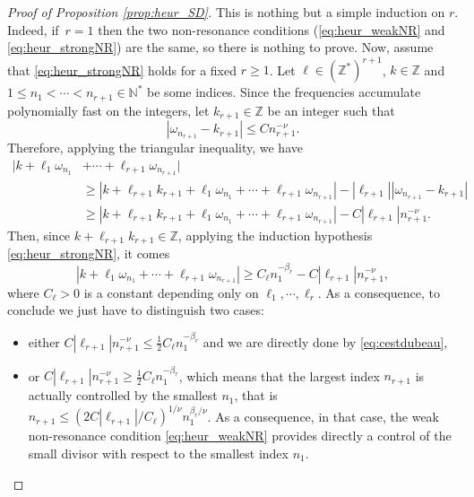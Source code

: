 \begin{proof}[Proof of Proposition \ref{prop:heur_SD}] This is nothing but a simple induction on $r$. Indeed, if~$r=1$ then the two non-resonance conditions (\eqref{eq:heur_weakNR} and \eqref{eq:heur_strongNR}) are the same, so there is nothing to prove. Now, assume that \eqref{eq:heur_strongNR} holds for a fixed $r\geq 1$. Let $\ell \in (\mathbb{Z}^*)^{r+1}$, $k \in \mathbb{Z}$ and $1\leq n_1< \cdots < n_{r+1} \in \mathbb{N}^*$ be some indices. Since the frequencies accumulate polynomially fast on the integers, let $k_{r+1} \in \mathbb{Z}$ be an integer such that
\[
|\omega_{n_{r+1}} - k_{r+1} | \leq C n_{r+1}^{-\nu}.
\]
Therefore, applying the triangular inequality, we have
\begin{equation*}
\begin{split}
|k+\ell_1 \omega_{n_1}& + \cdots + \ell_{r+1} \omega_{n_{r+1}}| \\ &\geq |k+\ell_{r+1} k_{r+1}+\ell_1 \omega_{n_1} + \cdots + \ell_{r+1} \omega_{n_{r+1}}|- |\ell_{r+1}| |\omega_{n_{r+1}} - k_{r+1} | \\
&\geq |k+\ell_{r+1} k_{r+1}+\ell_1 \omega_{n_1} + \cdots + \ell_{r+1} \omega_{n_{r+1}}|- C |\ell_{r+1}| n_{r+1}^{-\nu}.
\end{split}
\end{equation*}
Then, since $k+\ell_{r+1} k_{r+1} \in \mathbb{Z}$, applying the induction hypothesis \eqref{eq:heur_strongNR}, it comes
\begin{equation}
\label{eq:cestdubeau}
|k+\ell_1 \omega_{n_1} + \cdots + \ell_{r+1} \omega_{n_{r+1}}| \geq C_\ell n_1^{-\beta_r} - C | \ell_{r+1}| n_{r+1}^{-\nu},
\end{equation}
where $C_\ell >0$ is a constant depending only on $\ell_1,\cdots,\ell_r$. As a consequence, to conclude we just have to distinguish two cases:
\begin{itemize}
\item either $C | \ell_{r+1}| n_{r+1}^{-\nu} \leq \frac12 C_\ell n_1^{-\beta_r}$ and we are directly done by \eqref{eq:cestdubeau},
\item or $C | \ell_{r+1}| n_{r+1}^{-\nu} \geq \frac12 C_\ell n_1^{-\beta_r}$, which means that the largest index $n_{r+1}$ is actually controlled by the smallest $n_1$, that is $ n_{r+1} \leq (2 C | \ell_{r+1}| / C_\ell)^{1/\nu} n_1^{\beta_r/\nu}$. As a consequence, in that case, the weak non-resonance condition \eqref{eq:heur_weakNR} provides directly a control of the small divisor with respect to the smallest index $n_1$.\qedhere
\end{itemize}
\end{proof}

